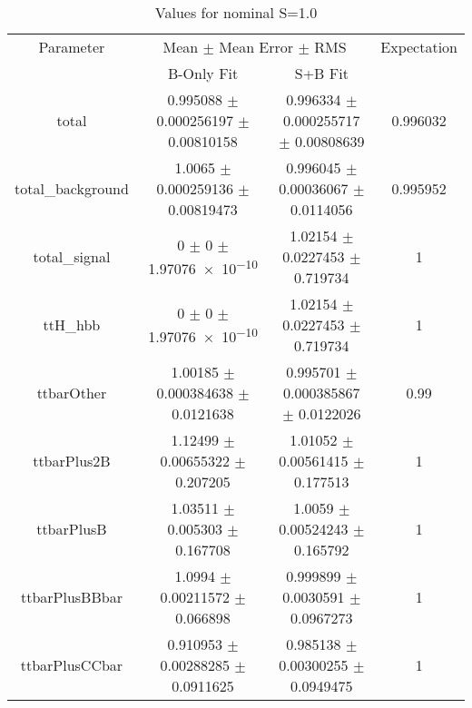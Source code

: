 \begin{table}
\centering
\caption{Values for nominal S=1.0}
\begin{tabular}{cccc}
\toprule
Parameter & \multicolumn{2}{c}{Mean $\pm$ Mean Error $\pm$ RMS} & Expectation\\
 & B-Only Fit & S+B Fit & \\
\midrule
total & \num{0.995088} $\pm$ \num{0.000256197} $\pm$ \num{0.00810158} & \num{0.996334} $\pm$ \num{0.000255717} $\pm$ \num{0.00808639} & \num{0.996032}\\
total\_background & \num{1.0065} $\pm$ \num{0.000259136} $\pm$ \num{0.00819473} & \num{0.996045} $\pm$ \num{0.00036067} $\pm$ \num{0.0114056} & \num{0.995952}\\
total\_signal & \num{0} $\pm$ \num{0} $\pm$ \num{1.97076e-10} & \num{1.02154} $\pm$ \num{0.0227453} $\pm$ \num{0.719734} & \num{1}\\
ttH\_hbb & \num{0} $\pm$ \num{0} $\pm$ \num{1.97076e-10} & \num{1.02154} $\pm$ \num{0.0227453} $\pm$ \num{0.719734} & \num{1}\\
ttbarOther & \num{1.00185} $\pm$ \num{0.000384638} $\pm$ \num{0.0121638} & \num{0.995701} $\pm$ \num{0.000385867} $\pm$ \num{0.0122026} & \num{0.99}\\
ttbarPlus2B & \num{1.12499} $\pm$ \num{0.00655322} $\pm$ \num{0.207205} & \num{1.01052} $\pm$ \num{0.00561415} $\pm$ \num{0.177513} & \num{1}\\
ttbarPlusB & \num{1.03511} $\pm$ \num{0.005303} $\pm$ \num{0.167708} & \num{1.0059} $\pm$ \num{0.00524243} $\pm$ \num{0.165792} & \num{1}\\
ttbarPlusBBbar & \num{1.0994} $\pm$ \num{0.00211572} $\pm$ \num{0.066898} & \num{0.999899} $\pm$ \num{0.0030591} $\pm$ \num{0.0967273} & \num{1}\\
ttbarPlusCCbar & \num{0.910953} $\pm$ \num{0.00288285} $\pm$ \num{0.0911625} & \num{0.985138} $\pm$ \num{0.00300255} $\pm$ \num{0.0949475} & \num{1}\\
\bottomrule
\end{tabular}
\end{table}